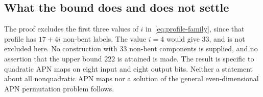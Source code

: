 \subsection{What the bound does and does not settle}
The proof excludes the first three values of $i$ in~\eqref{eq:profile-family}, since that profile has $17+4i$ non-bent labels. The value $i=4$ would give $33$, and is not excluded here. No construction with $33$ non-bent components is supplied, and no assertion that the upper bound $222$ is attained is made. The result is specific to quadratic APN maps on eight input and eight output bits. Neither a statement about all nonquadratic APN maps nor a solution of the general even-dimensional APN permutation problem follows.

